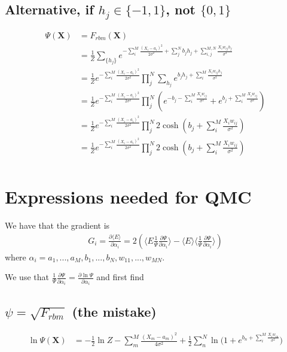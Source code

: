 \documentclass[norsk,a4paper,11pt]{article}
\begin{document}
\subsection{Alternative, if $h_j \in \{-1, 1\}$, not $\{0, 1\}$}
\begin{align}
\Psi (\mathbf{X}) &= F_{rbm}(\mathbf{X}) \\
&= \frac{1}{Z} \sum_{\{h_j\}} e^{-\sum_i^M \frac{(X_i - a_i)^2}{2\sigma^2} + \sum_j^N b_j h_j + \sum_{i,j}^{M,N} \frac{X_i w_{ij} h_j}{\sigma^2}} \\
&= \frac{1}{Z} e^{-\sum_i^M \frac{(X_i - a_i)^2}{2\sigma^2}} \prod_j^N \sum_{h_j}  e^{b_j h_j + \sum_i^M \frac{X_i w_{ij} h_j}{\sigma^2}} \\
&= \frac{1}{Z} e^{-\sum_i^M \frac{(X_i - a_i)^2}{2\sigma^2}} \prod_j^N ( e^{-b_j - \sum_i^M \frac{X_i w_{ij}}{\sigma^2}} + e^{b_j + \sum_i^M \frac{X_i w_{ij}}{\sigma^2}})  \\
&= \frac{1}{Z} e^{-\sum_i^M \frac{(X_i - a_i)^2}{2\sigma^2}} \prod_j^N 2\cosh(b_j + \sum_i^M \frac{X_i w_{ij}}{\sigma^2})\\
&= \frac{1}{Z} e^{-\sum_i^M \frac{(X_i - a_i)^2}{2\sigma^2}} \prod_j^N 2\cosh(b_j + \sum_i^M \frac{X_i w_{ij}}{\sigma^2}) \\
\end{align}


\section{Expressions needed for QMC}


We have that the gradient is \cite{jorgenthesis}
\begin{align}
	G_i = \frac{\partial \langle E \rangle}{\partial \alpha_i}
	= 2(\langle E \frac{1}{\Psi}\frac{\partial \Psi}{\partial \alpha_i} \rangle - \langle E \rangle \langle \frac{1}{\Psi}\frac{\partial \Psi}{\partial \alpha_i} \rangle )
\end{align}
where $\alpha_i = a_1,...,a_M,b_1,...,b_N,w_{11},...,w_{MN}$.

We use that $\frac{1}{\Psi}\frac{\partial \Psi}{\partial \alpha_i} 
	= \frac{\partial \ln{\Psi}}{\partial \alpha_i}$
and first find 

\color{Green}
\subsection{$\psi = \sqrt{F_{rbm}}$ (the mistake)}
\color{Black}
\begin{align}
	\ln{\Psi({\mathbf{X}})} &= -\frac{1}{2}\ln{Z} - \sum_m^M \frac{(X_m - a_m)^2}{4\sigma^2}
	+ \frac{1}{2}\sum_n^N \ln({1 + e^{b_n + \sum_i^M \frac{X_i w_{in}}{\sigma^2}})}
\end{align}
\end{document}
